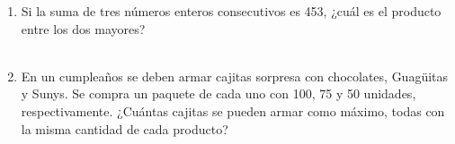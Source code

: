\documentclass[11pt,letterpaper]{article}
\newenvironment{alternativas}{%
\begin{enumerate}[label=\Alph*), leftmargin=14pt, itemsep=2pt, topsep=2pt]
}{\end{enumerate}}
\begin{document}
\begin{enumerate}[label=\textbf{\arabic*.}, leftmargin=*, itemsep=7pt]
\item
\begin{minipage}[t]{\linewidth}
Si la suma de tres números enteros consecutivos es 453, ¿cuál es el producto entre los dos mayores?\\
\\%
\begin{minipage}{\linewidth}
\vspace{7mm}
\end{minipage}
\vspace{7mm}
\end{minipage}

\item
\begin{minipage}[t]{\linewidth}
En un cumpleaños se deben armar cajitas sorpresa con chocolates, Guagüitas y Sunys. Se compra un paquete de cada uno con 100, 75 y 50 unidades, respectivamente. ¿Cuántas cajitas se pueden armar como máximo, todas con la misma cantidad de cada producto?\\
\\%
\begin{minipage}{\linewidth}
\vspace{7mm}
\end{minipage}
\vspace{7mm}
\end{minipage}


\end{enumerate}
\end{document}
